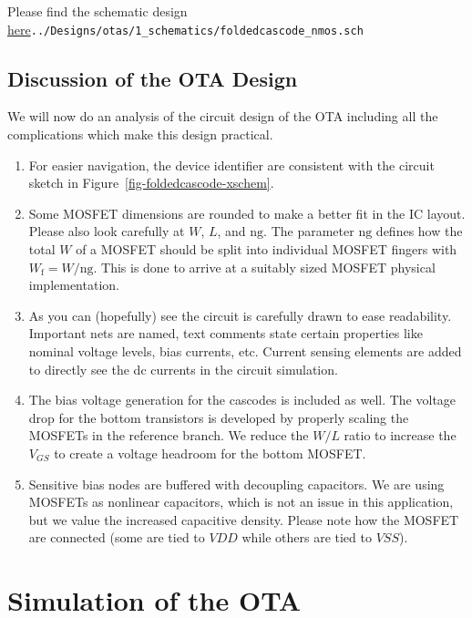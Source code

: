 \documentclass[
  11pt,
  a4paper,
  oneside]{scrbook}
\begin{document}
Please find the schematic design
\href{../Designs/otas/1_schematics/foldedcascode_nmos.sch}{here}\texttt{../Designs/otas/1\_schematics/foldedcascode\_nmos.sch}

\subsection{Discussion of the OTA
Design}\label{discussion-of-the-ota-design}

We will now do an analysis of the circuit design of the OTA including
all the complications which make this design practical.

\begin{enumerate}
\def\labelenumi{\arabic{enumi}.}
\item
  For easier navigation, the device identifier are consistent with the
  circuit sketch in Figure~\ref{fig-foldedcascode-xschem}.
\item
  Some MOSFET dimensions are rounded to make a better fit in the IC
  layout. Please also look carefully at \(W\), \(L\), and
  \(\mathrm{ng}\). The parameter \(\mathrm{ng}\) defines how the total
  \(W\) of a MOSFET should be split into individual MOSFET fingers with
  \(W_\mathrm{f} = W / \mathrm{ng}\). This is done to arrive at a
  suitably sized MOSFET physical implementation.
\item
  As you can (hopefully) see the circuit is carefully drawn to ease
  readability. Important nets are named, text comments state certain
  properties like nominal voltage levels, bias currents, etc. Current
  sensing elements are added to directly see the dc currents in the
  circuit simulation.
\item
  The bias voltage generation for the cascodes is included as well. The
  voltage drop for the bottom transistors is developed by properly
  scaling the MOSFETs in the reference branch. We reduce the \(W/L\)
  ratio to increase the \(V_{GS}\) to create a voltage headroom for the
  bottom MOSFET.
\item
  Sensitive bias nodes are buffered with decoupling capacitors. We are
  using MOSFETs as nonlinear capacitors, which is not an issue in this
  application, but we value the increased capacitive density. Please
  note how the MOSFET are connected (some are tied to \({VDD}\) while
  others are tied to \(V{SS}\)).
\end{enumerate}

\section{Simulation of the OTA}\label{sec-ota-simulation}
\end{document}
